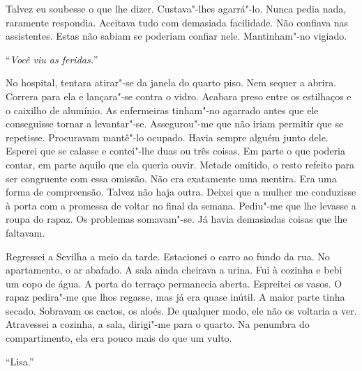 Talvez eu soubesse o que lhe dizer. Custava"-lhes agarrá"-lo. Nunca
pedia nada, raramente respondia. Aceitava tudo com demasiada facilidade.
Não confiava nas assistentes. Estas não sabiam se poderiam confiar nele.
Mantinham"-no vigiado.

``\emph{Você viu as feridas.}''

No hospital, tentara atirar"-se da janela do quarto piso. Nem sequer a
abrira. Correra para ela e lançara"-se contra o vidro. Acabara preso
entre os estilhaços e o caixilho de alumínio. As enfermeiras tinham"-no
agarrado antes que ele conseguisse tornar a levantar"-se. Assegurou"-me
que não iriam permitir que se repetisse. Procuravam mantê"-lo ocupado.
Havia sempre alguém junto dele. Esperei que se calasse e contei"-lhe
duas ou três coisas. Em parte o que poderia contar, em parte aquilo que
ela queria ouvir. Metade omitido, o resto refeito para ser congruente
com essa omissão. Não era exatamente uma mentira. Era uma forma de
compreensão. Talvez não haja outra. Deixei que a mulher me conduzisse à
porta com a promessa de voltar no final da semana. Pediu"-me que lhe
levasse a roupa do rapaz. Os problemas somavam"-se. Já havia demasiadas
coisas que lhe faltavam.

Regressei a Sevilha a meio da tarde. Estacionei o carro ao fundo da rua.
No apartamento, o ar abafado. A sala ainda cheirava a urina. Fui à
cozinha e bebi um copo de água. A porta do terraço permanecia aberta.
Espreitei os vasos. O rapaz pedira"-me que lhos regasse, mas já era
quase inútil. A maior parte tinha secado. Sobravam os cactos, os aloés.
De qualquer modo, ele não os voltaria a ver. Atravessei a cozinha, a
sala, dirigi"-me para o quarto. Na penumbra do compartimento, ela era
pouco mais do que um vulto.

``Lisa.''

